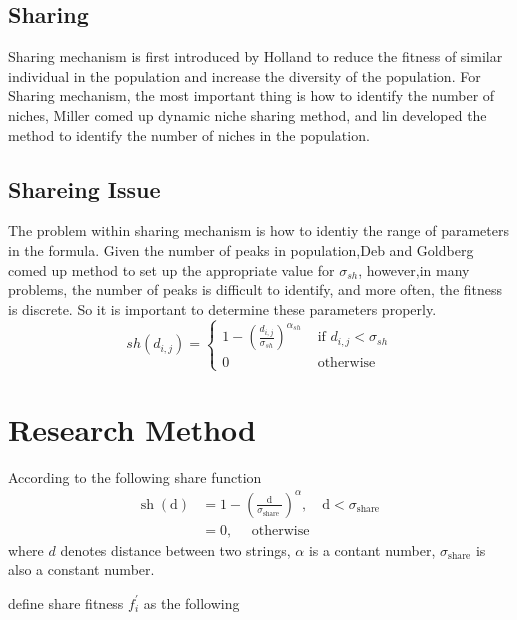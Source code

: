 \documentclass[smallextended]{svjour3}       %
\begin{document}
\begin{multicols}{2}
\subsection{Sharing}
Sharing mechanism is first introduced by Holland \cite{miller1996genetic} to
reduce the fitness of similar individual in the population and increase the
diversity of the population. For Sharing mechanism, the most important thing is
how to identify the number of niches, Miller comed up dynamic niche sharing
method, and lin developed the method to identify the number of niches in the
population.\cite{lin2002niche}

\subsection{Shareing Issue}
The problem within sharing mechanism is how to identiy the range of parameters
in the formula. Given the number of peaks in population,Deb and Goldberg comed
up method to set up the appropriate value for $\sigma_{sh}$, however,in many
problems, the number of peaks is difficult to identify, and more often, the
fitness is discrete. So it is important to determine these parameters properly.
\begin{equation}
s h\left(d_{i, j}\right)=\left\{\begin{array}{ll}{1-\left(\frac{d_{i, j}}{\sigma_{s h}}\right)^{\alpha_{s h}}} 
    & {\text { if } d_{i, j}<\sigma_{s h}} \\ 
{0} & {\text { otherwise }}\end{array}\right.
\end{equation}




\section{Research Method}
According to the following share function
$$
\begin{aligned} 
\operatorname{sh}(\mathrm{d}) & = 1 - \left(\frac{\mathrm{d}}{\sigma_{\text {share }}}\right)^{\alpha}, 
                                  \quad \mathrm{d}<\sigma_{\text {share }} \\ 
                              & = 0, \quad \text { otherwise }
\end{aligned}
$$
where $d$ denotes distance between two strings, $\alpha$ is a contant number,
$\sigma_{\text {share}}$ is also a constant number.

define share fitness $f_i^{\prime}$ as the following



\end{multicols}
\end{document}
